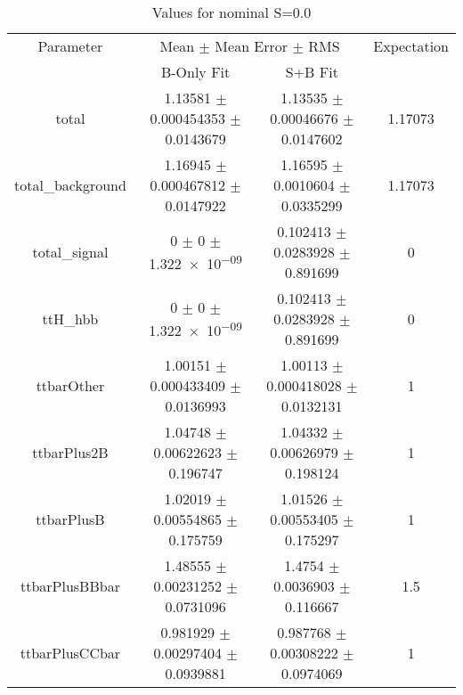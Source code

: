 \begin{table}
\centering
\caption{Values for nominal S=0.0}
\begin{tabular}{cccc}
\toprule
Parameter & \multicolumn{2}{c}{Mean $\pm$ Mean Error $\pm$ RMS} & Expectation\\
 & B-Only Fit & S+B Fit & \\
\midrule
total & \num{1.13581} $\pm$ \num{0.000454353} $\pm$ \num{0.0143679} & \num{1.13535} $\pm$ \num{0.00046676} $\pm$ \num{0.0147602} & \num{1.17073}\\
total\_background & \num{1.16945} $\pm$ \num{0.000467812} $\pm$ \num{0.0147922} & \num{1.16595} $\pm$ \num{0.0010604} $\pm$ \num{0.0335299} & \num{1.17073}\\
total\_signal & \num{0} $\pm$ \num{0} $\pm$ \num{1.322e-09} & \num{0.102413} $\pm$ \num{0.0283928} $\pm$ \num{0.891699} & \num{0}\\
ttH\_hbb & \num{0} $\pm$ \num{0} $\pm$ \num{1.322e-09} & \num{0.102413} $\pm$ \num{0.0283928} $\pm$ \num{0.891699} & \num{0}\\
ttbarOther & \num{1.00151} $\pm$ \num{0.000433409} $\pm$ \num{0.0136993} & \num{1.00113} $\pm$ \num{0.000418028} $\pm$ \num{0.0132131} & \num{1}\\
ttbarPlus2B & \num{1.04748} $\pm$ \num{0.00622623} $\pm$ \num{0.196747} & \num{1.04332} $\pm$ \num{0.00626979} $\pm$ \num{0.198124} & \num{1}\\
ttbarPlusB & \num{1.02019} $\pm$ \num{0.00554865} $\pm$ \num{0.175759} & \num{1.01526} $\pm$ \num{0.00553405} $\pm$ \num{0.175297} & \num{1}\\
ttbarPlusBBbar & \num{1.48555} $\pm$ \num{0.00231252} $\pm$ \num{0.0731096} & \num{1.4754} $\pm$ \num{0.0036903} $\pm$ \num{0.116667} & \num{1.5}\\
ttbarPlusCCbar & \num{0.981929} $\pm$ \num{0.00297404} $\pm$ \num{0.0939881} & \num{0.987768} $\pm$ \num{0.00308222} $\pm$ \num{0.0974069} & \num{1}\\
\bottomrule
\end{tabular}
\end{table}